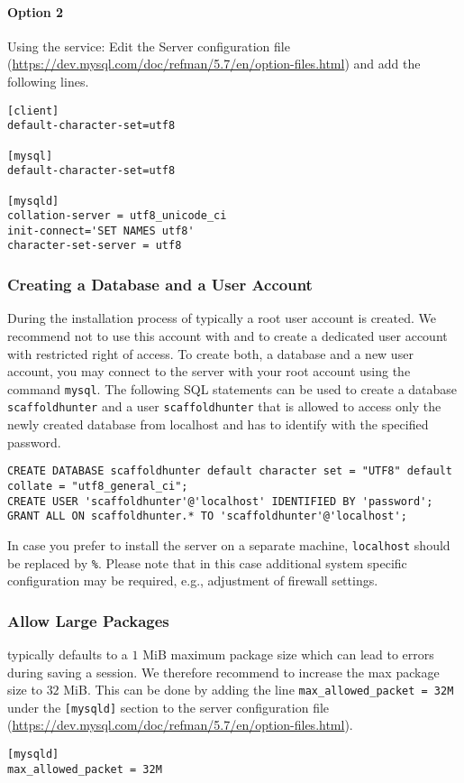 \paragraph{Option 2} Using the \mysql service: Edit the \mysql Server configuration file (\url{https://dev.mysql.com/doc/refman/5.7/en/option-files.html}) and add the following lines.
\begin{verbatim}
[client]
default-character-set=utf8

[mysql]
default-character-set=utf8

[mysqld]
collation-server = utf8_unicode_ci
init-connect='SET NAMES utf8'
character-set-server = utf8
\end{verbatim}


\subsubsection{Creating a Database and a User Account}
During the installation process of \mysql typically a root user account is created. We recommend not to use this account with \sh and to create a dedicated user account with restricted right of access. To create both, a database and a new user account, you may connect to the \mysql server with your root account using the command \texttt{mysql}. The following SQL statements can be used to create a database \texttt{scaffoldhunter} and a user \texttt{scaffoldhunter} that is allowed to access only the newly created database from localhost and has to identify with the specified password.
\begin{verbatim}
CREATE DATABASE scaffoldhunter default character set = "UTF8" default collate = "utf8_general_ci";
CREATE USER 'scaffoldhunter'@'localhost' IDENTIFIED BY 'password';
GRANT ALL ON scaffoldhunter.* TO 'scaffoldhunter'@'localhost';
\end{verbatim}
In case you prefer to install the \mysql server on a separate machine, \texttt{localhost} should be replaced by \texttt{\%}. Please note that in this case additional system specific configuration may be required, e.g., adjustment of firewall settings.


\subsubsection{Allow Large Packages}
\label{sec:mysql_max_package_size}
\mysql typically defaults to a $1$ MiB maximum package size which can lead to errors during saving a session. We therefore recommend to increase the max package size to $32$ MiB. This can be done by adding the line \texttt{max\_allowed\_packet = 32M} under the \texttt{[mysqld]} section to the \mysql server configuration file (\url{https://dev.mysql.com/doc/refman/5.7/en/option-files.html}).

\begin{verbatim}
[mysqld]
max_allowed_packet = 32M
\end{verbatim}
